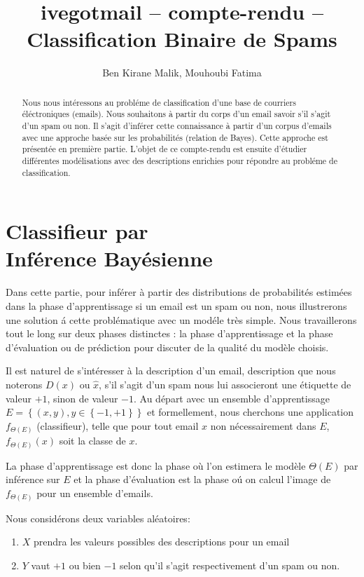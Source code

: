 \documentclass[a4paper, french]{article}
\title{ivegotmail -- compte-rendu --\\ Classification Binaire de Spams}
\author{Ben Kirane Malik, Mouhoubi Fatima}
\begin{document}
\maketitle
\setlength{\parskip}{0.1in}
\setlength{\parindent}{15pt}

\begin{abstract}
Nous nous int\'eressons au probl\'eme de classification d'une base de courriers \'el\'ectroniques (emails). Nous souhaitons \`a partir du corps d'un email savoir s'il s'agit d'un spam ou non. Il s'agit d'inf\'erer cette connaissance \`a partir d'un corpus d'emails avec une approche bas\'ee sur les probabilit\'es (relation de Bayes). Cette approche est  pr\'esent\'ee en premi\`ere partie. L'objet de ce compte-rendu est ensuite d'\'etudier diff\'erentes mod\'elisations avec des descriptions enrichies pour r\'epondre au probl\'eme de classification.
\end{abstract}

\section{Classifieur par\\Inf\'erence Bay\'esienne}
Dans cette partie, pour inf\'erer \`a partir des distributions de probabilit\'es estim\'ees dans la phase d'apprentissage si un email est un spam ou non, nous illustrerons une solution \'a cette probl\'ematique  avec un mod\'ele tr\`es simple.  
Nous travaillerons tout le long sur deux phases distinctes : la phase d'apprentissage et la phase d'\'evaluation ou de pr\'ediction pour discuter de la qualit\'e du mod\`ele choisis.

Il est naturel de s'int\'eresser \`a la description d'un email, description que nous noterons $D(x)$ ou $\hat{x}$, s'il s'agit d'un spam nous lui associeront une \'etiquette de valeur $+1$, sinon de valeur $-1$. 
Au d\'epart avec un ensemble d'apprentissage $E=\left\{(x,y), y\in \left\{-1,+1\right\}\right\}$ et formellement, nous cherchons une application $f_{\Theta(E)}$  (classifieur), telle que pour tout email $x$ non n\'ecessairement dans $E$, $f_{\Theta(E)}(x)$ soit la classe de $x$. 

La phase d'apprentissage est donc la phase o\`u l'on estimera le mod\`ele  $\Theta(E)$ par inf\'erence sur $E$ et la phase d'\'evaluation est la phase o\'u on calcul l'image de $f_{\Theta(E)}$ pour un ensemble d'emails.

Nous consid\'erons deux variables al\'eatoires:
\begin{enumerate}
\item $X$ prendra les valeurs possibles des descriptions pour un email
\item $Y$ vaut $+1$ ou bien $-1$ selon qu'il s'agit respectivement d'un spam ou non.
\end{enumerate}
\end{document}
